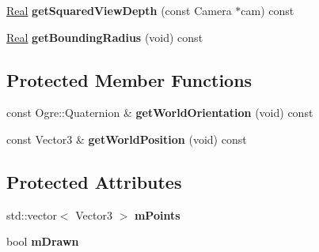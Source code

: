 \begin{DoxyCompactItemize}
\item 
\hypertarget{classphys_1_1internal_1_1Line3D_a04b77721c599bb368c791da7621fc814}{
\hyperlink{namespacephys_af7eb897198d265b8e868f45240230d5f}{Real} {\bfseries getSquaredViewDepth} (const Camera $\ast$cam) const }
\label{d4/db5/classphys_1_1internal_1_1Line3D_a04b77721c599bb368c791da7621fc814}

\item 
\hypertarget{classphys_1_1internal_1_1Line3D_a3fdd0ff2b7b22cebc71f796431afc7c8}{
\hyperlink{namespacephys_af7eb897198d265b8e868f45240230d5f}{Real} {\bfseries getBoundingRadius} (void) const }
\label{d4/db5/classphys_1_1internal_1_1Line3D_a3fdd0ff2b7b22cebc71f796431afc7c8}

\end{DoxyCompactItemize}
\subsection*{Protected Member Functions}
\begin{DoxyCompactItemize}
\item 
\hypertarget{classphys_1_1internal_1_1Line3D_a68aea39fc0eee3eeb744c5cd151ef209}{
const Ogre::Quaternion \& {\bfseries getWorldOrientation} (void) const }
\label{d4/db5/classphys_1_1internal_1_1Line3D_a68aea39fc0eee3eeb744c5cd151ef209}

\item 
\hypertarget{classphys_1_1internal_1_1Line3D_a2e81ac3696fedb22bd08688f7ecba2a8}{
const Vector3 \& {\bfseries getWorldPosition} (void) const }
\label{d4/db5/classphys_1_1internal_1_1Line3D_a2e81ac3696fedb22bd08688f7ecba2a8}

\end{DoxyCompactItemize}
\subsection*{Protected Attributes}
\begin{DoxyCompactItemize}
\item 
\hypertarget{classphys_1_1internal_1_1Line3D_acb6b813e2d713dbad02fe5a5ca1af97e}{
std::vector$<$ Vector3 $>$ {\bfseries mPoints}}
\label{d4/db5/classphys_1_1internal_1_1Line3D_acb6b813e2d713dbad02fe5a5ca1af97e}

\item 
\hypertarget{classphys_1_1internal_1_1Line3D_a7f3a190db3c0cd83ff4fdf3d95d6f0ee}{
bool {\bfseries mDrawn}}
\label{d4/db5/classphys_1_1internal_1_1Line3D_a7f3a190db3c0cd83ff4fdf3d95d6f0ee}

\end{DoxyCompactItemize}


